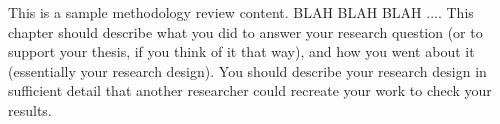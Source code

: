 This is a sample methodology review content. BLAH BLAH BLAH ....
This chapter should describe what you did to answer your research question (or to support your thesis, if you think of it that way), and how you went about it (essentially your research design). You should describe your research design in sufficient detail that another researcher could recreate your work to check your results.